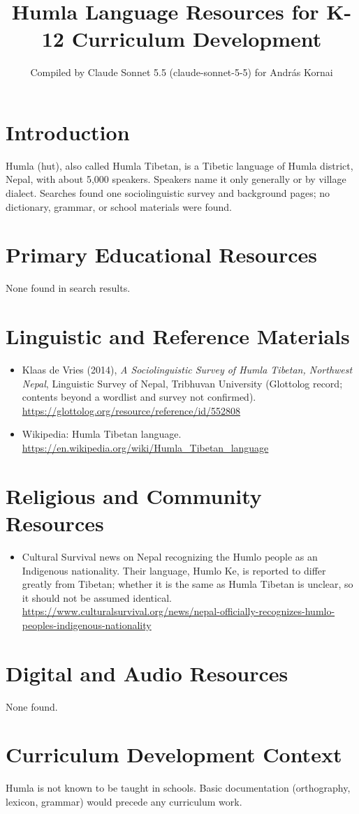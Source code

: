 \documentclass[12pt]{article}
\title{Humla Language Resources for K-12 Curriculum Development}
\author{Compiled by Claude Sonnet 5.5 (claude-sonnet-5-5) for Andr\'as Kornai}
\date{}
\begin{document}
\maketitle

\section{Introduction}
Humla (hut), also called Humla Tibetan, is a Tibetic language of Humla district, Nepal, with about 5,000 speakers. Speakers name it only generally or by village dialect. Searches found one sociolinguistic survey and background pages; no dictionary, grammar, or school materials were found.

\section{Primary Educational Resources}
None found in search results.

\section{Linguistic and Reference Materials}
\begin{itemize}
\item Klaas de Vries (2014), \emph{A Sociolinguistic Survey of Humla Tibetan, Northwest Nepal}, Linguistic Survey of Nepal, Tribhuvan University (Glottolog record; contents beyond a wordlist and survey not confirmed). \url{https://glottolog.org/resource/reference/id/552808}
\item Wikipedia: Humla Tibetan language. \url{https://en.wikipedia.org/wiki/Humla_Tibetan_language}
\end{itemize}

\section{Religious and Community Resources}
\begin{itemize}
\item Cultural Survival news on Nepal recognizing the Humlo people as an Indigenous nationality. Their language, Humlo Ke, is reported to differ greatly from Tibetan; whether it is the same as Humla Tibetan is unclear, so it should not be assumed identical. \url{https://www.culturalsurvival.org/news/nepal-officially-recognizes-humlo-peoples-indigenous-nationality}
\end{itemize}

\section{Digital and Audio Resources}
None found.

\section{Curriculum Development Context}
Humla is not known to be taught in schools. Basic documentation (orthography, lexicon, grammar) would precede any curriculum work.
\end{document}
